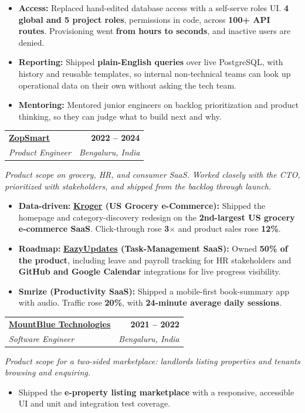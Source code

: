 \documentclass[letterpaper,10.5pt]{article}
\makeatletter
\newcommand{\entry}[4]{%
  \begin{tabularx}{\linewidth}{@{}X@{}r@{}}
    \textbf{#1} & \textbf{#4} \\
    \textit{#2} & \textit{#3} \\
  \end{tabularx}%
  \vspace{1pt}
}
\makeatother
\begin{document}
\begin{itemize}
  \item \textbf{Access:} Replaced hand-edited database access with a self-serve roles UI. \textbf{4 global and 5 project roles}, permissions in code, across \textbf{100+ API routes}. Provisioning went \textbf{from hours to seconds}, and inactive users are denied.
  \item \textbf{Reporting:} Shipped \textbf{plain-English queries} over live PostgreSQL, with history and reusable templates, so internal non-technical teams can look up operational data on their own without asking the tech team.
  \item \textbf{Mentoring:} Mentored junior engineers on backlog prioritization and product thinking, so they can judge what to build next and why.
\end{itemize}

\entry{\href{https://zopsmart.com}{ZopSmart}}{Product Engineer}{Bengaluru, India}{2022 -- 2024}
{\small\textit{Product scope on grocery, HR, and consumer SaaS. Worked closely with the CTO, prioritized with stakeholders, and shipped from the backlog through launch.}}
\begin{itemize}
  \item \textbf{Data-driven:} \textbf{\href{https://www.kroger.com}{Kroger} (US Grocery e-Commerce):} Shipped the homepage and category-discovery redesign on the \textbf{2nd-largest US grocery e-commerce SaaS}. Click-through rose \textbf{3$\times$} and product sales rose \textbf{12\%}.
  \item \textbf{Roadmap:} \textbf{\href{https://eazyupdates.com}{EazyUpdates} (Task-Management SaaS):} Owned \textbf{50\% of the product}, including leave and payroll tracking for HR stakeholders and \textbf{GitHub and Google Calendar} integrations for live progress visibility.
  \item \textbf{Smrize (Productivity SaaS):} Shipped a mobile-first book-summary app with audio. Traffic rose \textbf{20\%}, with \textbf{24-minute average daily sessions}.
\end{itemize}

\entry{\href{https://mountblue.io}{MountBlue Technologies}}{Software Engineer}{Bengaluru, India}{2021 -- 2022}
{\small\textit{Product scope for a two-sided marketplace: landlords listing properties and tenants browsing and enquiring.}}
\begin{itemize}
  \item Shipped the \textbf{e-property listing marketplace} with a responsive, accessible UI and unit and integration test coverage.
\end{itemize}
\end{document}
